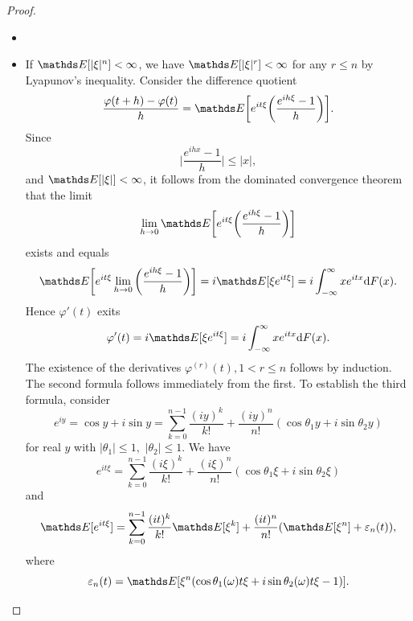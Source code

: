 \begin{proof}
\begin{itemize}
    \item []
    \item If $\E[|\xi|^n] < \infty$, we have $\E[|\xi|^r] < \infty$ for any $r \le n$ by Lyapunov's inequality. Consider the difference quotient 
\begin{equation*}
    \frac{\varphi(t + h) - \varphi(t)}{h} = \E\bigg[e^{i t\xi} \bigg(\frac{e^{ih\xi} - 1}{h}\bigg)\bigg].
\end{equation*}
Since 
\begin{equation*}
    \bigg| \frac{e^{ihx}-1}{h} \bigg| \le |x|,
\end{equation*}
and $\E[|\xi|] < \infty$, it follows from the dominated convergence theorem that the limit
\begin{equation*}
    \lim_{h \to 0} \E\bigg[e^{i t\xi} \bigg(\frac{e^{ih\xi} - 1}{h}\bigg)\bigg]
\end{equation*}
exists and equals
\begin{equation*}
    \E\bigg[e^{i t\xi} \lim_{h \to 0}\bigg(\frac{e^{ih\xi} - 1}{h}\bigg)\bigg] = i \E[\xi e^{it\xi}] = i\int_{-\infty}^\infty x e^{itx} \d F(x).
\end{equation*}
Hence $\varphi'(t)$ exits
\begin{equation*}
    \varphi'(t) = i \E[\xi e^{it\xi}] = i\int_{-\infty}^\infty x e^{itx} \d F(x).
\end{equation*}
The existence of the derivatives $\varphi^{(r)}(t), 1 < r \le n$ follows by induction. The second formula follows immediately from the first. To establish the third formula, consider
\begin{equation*}
    e^{iy} = \cos y + i \sin y = \sum_{k=0}^{n-1} \frac{(iy)^k}{k!} + \frac{(iy)^n}{n!}(\cos \theta_1y + i \sin \theta_2 y)
\end{equation*}
for real $y$ with $|\theta_1| \le 1,$ $|\theta_2| \le 1$. We have 
\begin{equation*}
    e^{it\xi} = \sum_{k=0}^{n-1} \frac{(i\xi)^k}{k!} + \frac{(i\xi)^n}{n!}(\cos \theta_1\xi + i \sin \theta_2 \xi)
\end{equation*}
and 
\begin{equation*}
    \E[e^{it\xi}] = \sum_{k=0}^{n-1} \frac{(it)^k}{k!}\E[\xi^k] + \frac{(it)^n}{n!}(\E[\xi^n] + \varepsilon_n(t)),
\end{equation*}
where
\begin{equation*}
    \varepsilon_n(t) = \E[\xi^n (\cos \theta_1(\omega) t \xi + i \sin \theta_2(\omega)t \xi - 1)].

\end{equation*}
\end{itemize}
\end{proof}
